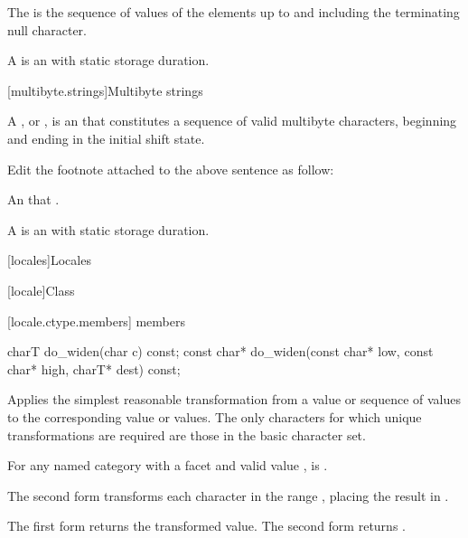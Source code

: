 \documentclass{wg21}
\begin{document}
\pnum
The 
is the sequence of values of the
elements up to and including the terminating null character.

\pnum
A 
is an \ntbs{} with
static storage duration.

[multibyte.strings]{Multibyte strings}

%
\pnum
A ,
or \ntmbs{},
is an \ntbs{} that constitutes a
sequence of valid multibyte characters, beginning and ending in the initial
shift state.

\begin{quoteblock}
Edit the footnote attached to the above sentence as follow:
\begin{quoteblock}
An \ntbs{} that .
\end{quoteblock}
\end{quoteblock}

\pnum
A 
is an \ntmbs{} with static storage duration.


[locales]{Locales}

[locale]{Class }

[locale.ctype.members]{ members}

%
\begin{itemdecl}
    charT        do_widen(char c) const;
    const char*  do_widen(const char* low, const char* high, charT* dest) const;
\end{itemdecl}

\begin{itemdescr}
\pnum
\effects
Applies the simplest reasonable transformation
from a  value or sequence of  values
to the corresponding  value or values.
The only characters for which unique transformations are required
are those in the basic  character set.

For any named  category with
a  facet  and
valid  value ,
 is .

The second form transforms
each character  in the range ,
placing the result in .

\pnum
\returns
The first form returns the transformed value.
The second form returns .
\end{itemdescr}
\end{document}
